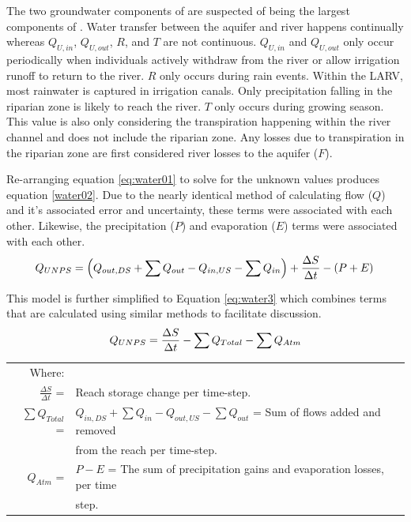 \begin{linenumbers}
The two groundwater components of \Qnps are suspected of being the largest components of \Qnps.  Water transfer between the aquifer and river happens continually whereas $ Q_{U,in} $, $ Q_{U,out} $, $ R $, and $ T $ are not continuous.  $ Q_{U,in} $ and $ Q_{U,out} $ only occur periodically when individuals actively withdraw from the river or allow irrigation runoff to return to the river.  $ R $ only occurs during rain events.  Within the LARV, most rainwater is captured in irrigation canals.  Only precipitation falling in the riparian zone is likely to reach the river.  $ T $ only occurs during growing season.  This value is also only considering the transpiration happening within the river channel and does not include the riparian zone.  Any losses due to transpiration in the riparian zone are first considered river losses to the aquifer ($ F $).

Re-arranging equation \eqref{eq:water01} to solve for the unknown values produces equation \ref{water02}.  Due to the nearly identical method of calculating flow ($ Q $) and it's associated error and uncertainty, these terms were associated with each other.  Likewise, the precipitation ($ P $) and evaporation ($ E $) terms were associated with each other.
\begin{equation}
	\label{eq:water2}
	Q_{UNPS} = \left( Q_{out,DS} + \sum Q_{out} - Q_{in,US} - \sum Q_{in} \right) + \frac{\Delta S}{\Delta t} - \left( P + E \right)\\ 
\end{equation}

This model is further simplified to Equation \ref{eq:water3} which combines terms that are calculated using similar methods to facilitate discussion.
\begin{equation}
	\label{eq:water3}
	Q_{UNPS} = \frac{\Delta S}{\Delta t} - \sum Q_{Total} - \sum Q_{Atm}\\ 
\end{equation}
\begin{tabular}{r p{5.5in}}
	Where:&\\
	$ \displaystyle \frac{\Delta S}{\Delta t} $ = & Reach storage change per time-step.\\
	$ \displaystyle \sum Q_{Total} $ = & $ Q_{in,DS} + \sum Q_{in} - Q_{out,US} - \sum Q_{out} $ = Sum of flows added and removed \\
		& from the reach per time-step. \\
	$ Q_{Atm} $ = & $ P - E $ = The sum of precipitation gains and evaporation losses, per time \\
		& step.\\
\end{tabular}\\


\end{linenumbers}
